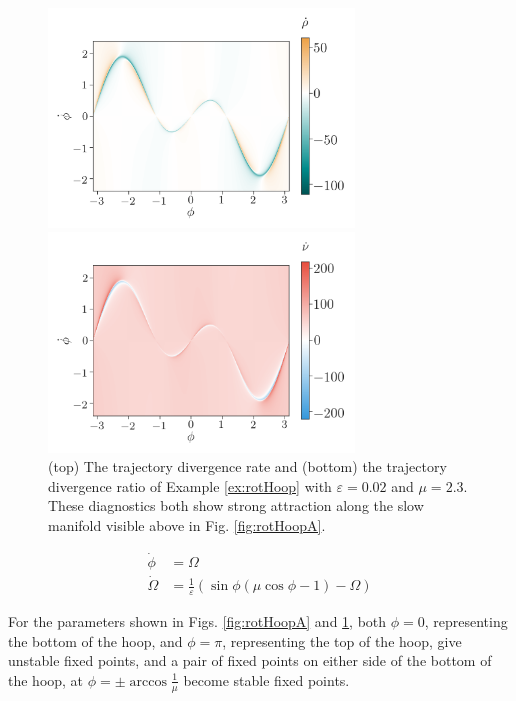 \documentclass[twocolumn]{svjour3}
\begin{document}
\begin{figure}
\begin{minipage}{3.2in}
\centering
\includegraphics[width=3.2in]{Fig8}
\end{minipage}
\begin{minipage}{3.2in}
\centering
\includegraphics[width=3.2in]{Fig9}
\end{minipage}
\caption{\label{fig:rotHoopB} (top) The trajectory divergence rate and (bottom) the trajectory divergence ratio of Example \ref{ex:rotHoop} with $\varepsilon = 0.02$ and $\mu = 2.3$. These diagnostics both show strong attraction along the slow manifold visible above in Fig. \ref{fig:rotHoopA}.}
\end{figure}

\begin{equation}
\begin{aligned}
\dot{\phi} & = \Omega \\
\dot{\Omega } & = \frac{1}{\varepsilon}\left(\sin\phi(\mu\cos\phi - 1) - \Omega\right)
\end{aligned}
\label{eq:rotHoop}
\end{equation}

For the parameters shown in Figs. \ref{fig:rotHoopA} and \ref{fig:rotHoopB}, both $\phi=0$, representing the bottom of the hoop, and $\phi=\pi$, representing the top of the hoop, give unstable fixed points, and a pair of fixed points on either side of the bottom of the hoop, at $\phi=\pm\arccos\tfrac{1}{\mu}$ become stable fixed points.
\end{document}
